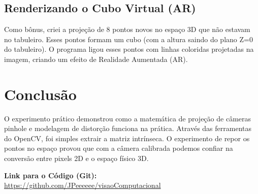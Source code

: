 \documentclass[twocolumn]{article}
\begin{document}
\subsection{Renderizando o Cubo Virtual (AR)}
Como bônus, criei a projeção de 8 pontos novos no espaço 3D que não estavam no tabuleiro. Esses pontos formam um cubo (com a altura saindo do plano Z=0 do tabuleiro). O programa ligou esses pontos com linhas coloridas projetadas na imagem, criando um efeito de Realidade Aumentada (AR).

\section{Conclusão}
O experimento prático demonstrou como a matemática de projeção de câmeras pinhole e modelagem de distorção funciona na prática. Através das ferramentas do OpenCV, foi simples extrair a matriz intrínseca. O experimento de repor os pontos no espaço provou que com a câmera calibrada podemos confiar na conversão entre pixels 2D e o espaço físico 3D.

\vspace{12pt}
\noindent\textbf{Link para o Código (Git):} \\
\url{https://github.com/JPeeeeee/visaoComputacional}
\end{document}
